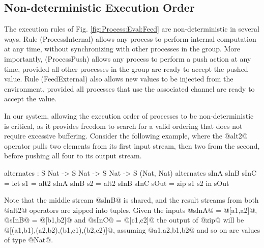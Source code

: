 \subsection{Non-deterministic Execution Order}
\label{s:EvaluationOrder}
%
%
%
%
%
%

The execution rules of Fig. \ref{fig:Process:Eval:Feed} are non-deterministic in several ways. Rule (ProcessInternal) allows any process to perform internal computation at any time, without synchronizing with other processes in the group. More importantly, (ProcessPush) allows any process to perform a push action at any time, provided all other processes in the group are ready to accept the pushed value. Rule (FeedExternal) also allows new values to be injected from the environment, provided all processes that use the associated channel are ready to accept the value.

In our system, allowing the execution order of processes to be non-deterministic is critical, as it provides freedom to search for a valid ordering that does not require excessive buffering. Consider the following example, where the @alt2@ operator pulls two elements from its first input stream, then two from the second, before pushing all four to its output stream.
\begin{code}
  alternates : S Nat -> S Nat -> S Nat -> S (Nat, Nat)
  alternates sInA sInB sInC
   = let  s1   = alt2 sInA sInB
          s2   = alt2 sInB sInC
          sOut = zip s1 s2
     in   sOut
\end{code}

Note that the middle stream @sInB@ is shared, and the result streams from both @alt2@ operators are zipped into tuples. Given the inputs @sInA@ = @[a1,a2]@, @sInB@ = @[b1,b2]@ and @sInC@ = @[c1,c2]@ the output of @zip@ will be @[(a1,b1),(a2,b2),(b1,c1),(b2,c2)]@, assuming @a1,a2,b1,b2@ and so on are values of type @Nat@.

